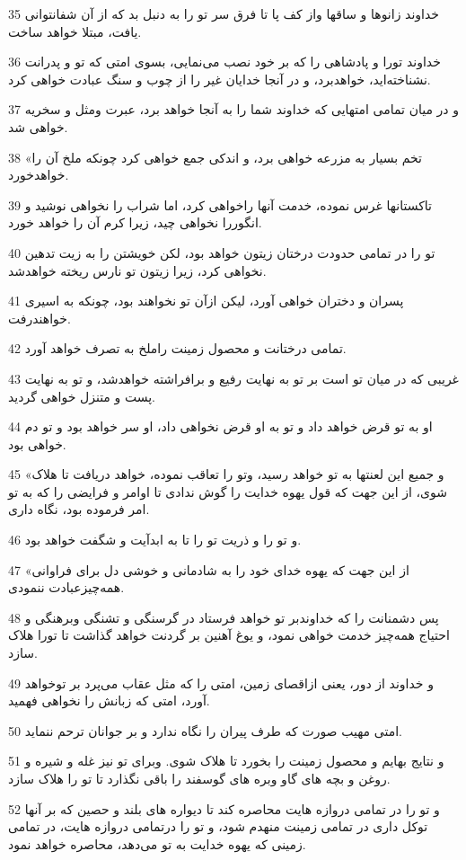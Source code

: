 \par 35 خداوند زانوها و ساقها واز کف پا تا فرق سر تو را به دنبل بد که از آن شفانتوانی یافت، مبتلا خواهد ساخت.
\par 36 خداوند تورا و پادشاهی را که بر خود نصب می‌نمایی، بسوی امتی که تو و پدرانت نشناخته‌اید، خواهدبرد، و در آنجا خدایان غیر را از چوب و سنگ عبادت خواهی کرد.
\par 37 و در میان تمامی امتهایی که خداوند شما را به آنجا خواهد برد، عبرت ومثل و سخریه خواهی شد.
\par 38 «تخم بسیار به مزرعه خواهی برد، و اندکی جمع خواهی کرد چونکه ملخ آن را خواهدخورد.
\par 39 تاکستانها غرس نموده، خدمت آنها راخواهی کرد، اما شراب را نخواهی نوشید و انگوررا نخواهی چید، زیرا کرم آن را خواهد خورد.
\par 40 تو را در تمامی حدودت درختان زیتون خواهد بود، لکن خویشتن را به زیت تدهین نخواهی کرد، زیرا زیتون تو نارس ریخته خواهدشد.
\par 41 پسران و دختران خواهی آورد، لیکن ازآن تو نخواهند بود، چونکه به اسیری خواهندرفت.
\par 42 تمامی درختانت و محصول زمینت راملخ به تصرف خواهد آورد.
\par 43 غریبی که در میان تو است بر تو به نهایت رفیع و برافراشته خواهدشد، و تو به نهایت پست و متنزل خواهی گردید.
\par 44 او به تو قرض خواهد داد و تو به او قرض نخواهی داد، او سر خواهد بود و تو دم خواهی بود.
\par 45 «و جمیع این لعنتها به تو خواهد رسید، وتو را تعاقب نموده، خواهد دریافت تا هلاک شوی، از این جهت که قول یهوه خدایت را گوش ندادی تا اوامر و فرایضی را که به تو امر فرموده بود، نگاه داری.
\par 46 و تو را و ذریت تو را تا به ابدآیت و شگفت خواهد بود.
\par 47 «از این جهت که یهوه خدای خود را به شادمانی و خوشی دل برای فراوانی همه‌چیزعبادت ننمودی.
\par 48 پس دشمنانت را که خداوندبر تو خواهد فرستاد در گرسنگی و تشنگی وبرهنگی و احتیاج همه‌چیز خدمت خواهی نمود، و یوغ آهنین بر گردنت خواهد گذاشت تا تورا هلاک سازد.
\par 49 و خداوند از دور، یعنی ازاقصای زمین، امتی را که مثل عقاب می‌پرد بر توخواهد آورد، امتی که زبانش را نخواهی فهمید.
\par 50 امتی مهیب صورت که طرف پیران را نگاه ندارد و بر جوانان ترحم ننماید.
\par 51 و نتایج بهایم و محصول زمینت را بخورد تا هلاک شوی. وبرای تو نیز غله و شیره و روغن و بچه های گاو وبره های گوسفند را باقی نگذارد تا تو را هلاک سازد.
\par 52 و تو را در تمامی دروازه هایت محاصره کند تا دیواره های بلند و حصین که بر آنها توکل داری در تمامی زمینت منهدم شود، و تو را درتمامی دروازه هایت، در تمامی زمینی که یهوه خدایت به تو می‌دهد، محاصره خواهد نمود.
